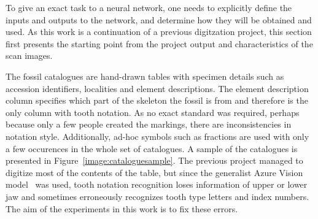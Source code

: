 \documentclass[english,twoside,openright]{UH_DS_MSc}
\begin{document}
To give an exact task to a neural network, one needs to explicitly define 
the inputs and outputs to the network, and determine how they will be obtained and used.
 As this work is a continuation of 
a previous digitzation project, this section first presents the starting point 
from the project output and characteristics of the scan images. 

The fossil catalogues are hand-drawn tables with specimen details such 
as accession identifiers, localities and element descriptions. The element description 
column specifies which part of the skeleton the fossil is from and therefore is the only 
column with tooth notation.
As no exact standard was required, perhaps because only a few people 
created the markings, there are inconsistencies in notation style. Additionally,
ad-hoc symbols such as fractions are used with only a few occurences in the whole set of catalogues. 
A sample of the catalogues is presented in Figure~\ref{image:cataloguesample}.
The previous project managed to digitize most of the contents of the table, but since 
the generalist Azure Vision model~\cite{azurevision} was used, tooth notation recognition
loses information of upper or lower jaw and sometimes
erroneously recognizes tooth type letters and index numbers.
The aim of the experiments in this work is to fix these errors.
\end{document}
